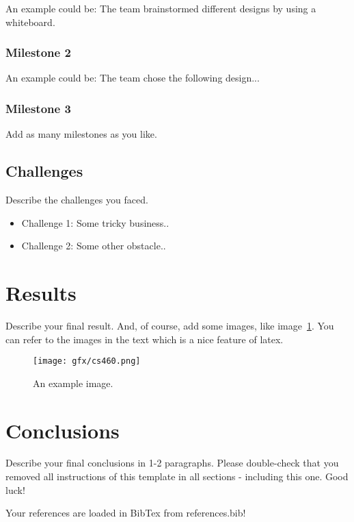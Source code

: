 \documentclass[sigconf]{acmart}
\begin{document}
An example could be: The team brainstormed different designs by using a whiteboard.

\subsubsection{Milestone 2}

An example could be: The team chose the following design...

\subsubsection{Milestone 3}

Add as many milestones as you like.

\subsection{Challenges}

Describe the challenges you faced.

\begin{itemize}
    \item Challenge 1: Some tricky business..
    \item Challenge 2: Some other obstacle..
\end{itemize}

\section{Results}

Describe your final result. And, of course, add some images, like image~\ref{fig:example}. You can refer to the images in the text which is a nice feature of latex.


\begin{figure}[h]
  \centering
  \texttt{[image: gfx/cs460.png]}
  \caption{An example image.}
  \label{fig:example}
\end{figure}

\section{Conclusions}

Describe your final conclusions in 1-2 paragraphs. Please double-check that you removed all instructions of this template in all sections - including this one. Good luck!

Your references are loaded in BibTex from references.bib!



\end{document}

